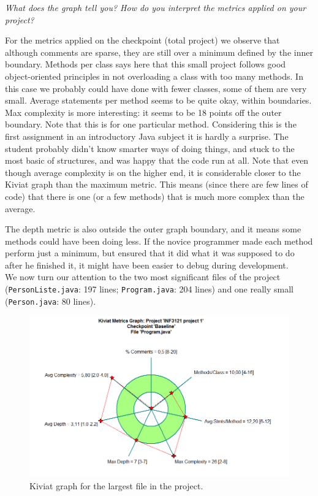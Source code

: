 \documentclass{article}
\begin{document}
\textit{What does the graph tell you? How do you interpret the metrics applied on your project?}

For the metrics applied on the checkpoint (total project) we observe that although comments are sparse, they are still over a minimum defined by the 
inner boundary. Methods per class says here that this small project follows good object-oriented principles in not overloading a class with too many methods. 
In this case we probably could have done with fewer classes, some of them are very small. Average statements per method seems to be quite okay, within 
boundaries. Max complexity is more interesting: it seems to be 18 points off the outer boundary. Note that this is for one particular method. Considering this is 
the first assignment in an introductory Java subject it is hardly a surprise. The student probably didn't know smarter ways of doing things, and stuck to 
the most basic of structures, and was happy that the code run at all. Note that even though average complexity is on the higher end, it is considerable 
closer to the Kiviat graph than the maximum metric. This means (since there are few lines of code) that there is one (or a few methods) that is much 
more complex than the average.

The depth metric is also outside the outer graph boundary, and it means some methods could have been doing less. If the novice programmer made each method perform 
just a minimum, but ensured that it did what it was supposed to do after he finished it, it might have been easier to debug during development. \\

\noindent We now turn our attention to the two most significant files of the project (\texttt{PersonListe.java}: 197 lines; \texttt{Program.java}: 204 lines) 
and one really small (\texttt{Person.java}: 80 lines). \\

\begin{figure}
\includegraphics[scale=0.5]{step3-2_kiviat_Program}
\caption{
Kiviat graph for the largest file in the project.
}
\end{figure}
\end{document}
